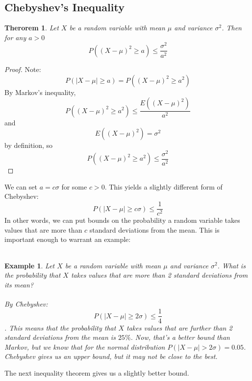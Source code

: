 \documentclass[12pt]{article} %
\newtheorem{example}{Example}
\newtheorem{thm}{Therorem}
\begin{document}
\subsection{Chebyshev's Inequality}
\begin{thm}
Let $X$ be a random variable with mean $\mu$ and variance $\sigma^2$. Then for any $a>0$
$$P((X-\mu)^2\geq a)\leq \frac{\sigma^2}{a^2}$$
\end{thm}
\begin{proof}
Note:
$$P(|X-\mu|\geq a) = P((X-\mu)^2\geq a^2)$$
By Markov's inequality,
$$P((X-\mu)^2\geq a^2) \leq \frac{E((X-\mu)^2)}{a^2}$$
and 
$$E((X-\mu)^2) = \sigma^2$$
by definition, so
$$P((X-\mu)^2\geq a^2) \leq \frac{\sigma^2}{a^2}$$
\end{proof}
We can set $a=c\sigma$ for some $c>0$. This yields a slightly different form of Chebyshev:
$$P(|X-\mu| \geq c\sigma)\leq \frac1{c^2}$$
In other words, we can put bounds on the probability a random variable takes values that are more than $c$ standard deviations from the mean. This is important enough to warrant an example:\\\\
\begin{example}
Let $X$ be a random variable with mean $\mu$ and variance $\sigma^2$. What is the probability that $X$ takes values that are more than 2 standard deviations from its mean?\\\\
By Chebyshev:
$$P(|X-\mu|\geq 2\sigma) \leq \frac14$$.
This means that the probability that $X$ takes values that are further than 2 standard deviations from the mean is $25\%$. Now, that's a better bound than Markov, but we know that for the normal distribution $P(|X-\mu|>2\sigma) = 0.05$. Chebyshev gives us \emph{an} upper bound, but it may not be close to the best.
\end{example}
The next inequality theorem gives us a slightly better bound.
\end{document}
